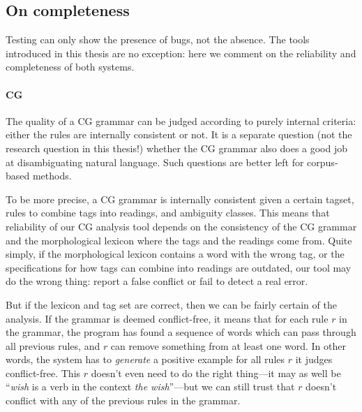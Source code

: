 \subsection{On completeness}

Testing can only show the presence of bugs, not the absence. The tools
introduced in this thesis are no exception: here we comment on the
reliability and completeness of both systems.


\paragraph{CG}

The quality of a CG grammar can be judged according to purely internal
criteria: either the rules are internally consistent or not. It is a
separate question (not the research question in this thesis!) whether
the CG grammar also does a good job at disambiguating natural
language. Such questions are better left for corpus-based methods.

To be more precise, a CG grammar is internally consistent given a
certain tagset, rules to combine tags into readings, and ambiguity
classes. %
This means that reliability of our CG analysis tool depends on the
consistency of the CG grammar and the morphological lexicon where the
tags and the readings come from. Quite simply, if the morphological
lexicon contains a word with the wrong tag, or the specifications for
how tags can combine into readings are outdated, our tool may do the
wrong thing: report a false conflict or fail to detect a real error.

But if the lexicon and tag set are correct, then we can be fairly
certain of the analysis. If the grammar is deemed conflict-free, it
means that for each rule $r$ in the grammar, the program has found a
sequence of words which can pass through all previous rules, and $r$
can remove something from at least one word. In other words, the
system has to \emph{generate} a positive example for all rules $r$ it
judges conflict-free. %
This $r$ doesn't even need to do the right thing---it may as well be
``\emph{wish} is a verb in the context \emph{the wish}''---but we can
still trust that $r$ doesn't conflict with any of the previous rules
in the grammar.



